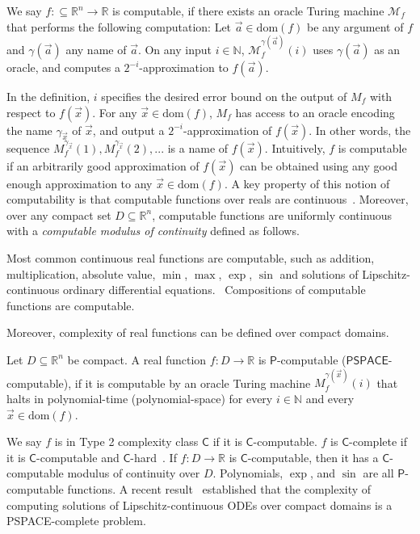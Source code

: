 \documentclass[envcountsect]{llncs}
\newcommand{\dom}{\mathrm{dom}}
\begin{document}
\begin{definition} We say $f:\subseteq\mathbb{R}^n\rightarrow \mathbb{R}$ is computable, if there exists an oracle Turing machine $\mathcal{M}_f$ that performs the following computation: Let $\vec a\in \dom(f)$ be any argument of $f$ and $\gamma(\vec a)$ any name of $\vec a$. On any input $i\in \mathbb{N}$, $\mathcal{M}_f^{\gamma(\vec a)}(i)$ uses $\gamma(\vec a)$ as an oracle, and computes a $2^{-i}$-approximation to $f(\vec a)$. 
\end{definition}



In the definition, $i$ specifies the desired error bound on the output of $M_f$ with respect to $f(\vec x)$. For any $\vec x\in \dom(f)$, $M_f$ has access to an oracle encoding the name $\gamma_{\vec x}$ of $\vec x$, and output a $2^{-i}$-approximation of $f(\vec x)$. In other words, the sequence $M_f^{\gamma_{\vec x}}(1), M_f^{\gamma_{\vec x}}(2), ...$ is a name of $f(\vec x)$. Intuitively, $f$ is computable if an arbitrarily good approximation of $f(\vec x)$ can be obtained using any good enough approximation to any $\vec x\in\dom(f)$. A key property of this notion of computability is that computable functions over reals are continuous~\cite{CAbook}. Moreover, over any compact set $D\subseteq \mathbb{R}^n$, computable functions are uniformly continuous with a {\em computable modulus of continuity} defined as follows. 

Most common continuous real functions are computable, such as addition, multiplication, absolute value, $\min$, $\max$, $\exp$, $\sin$ and solutions of Lipschitz-continuous ordinary differential equations.~\cite{CAbook} Compositions of computable functions are computable.


Moreover, complexity of real functions can be defined over compact domains. 

\begin{definition}[\cite{Ko92}] Let $D\subseteq \mathbb{R}^n$ be compact. A real function $f:D\rightarrow\mathbb{R}$ is $\mathsf{P}$-computable ($\mathsf{PSPACE}$-computable), if it is computable by an oracle Turing machine $M_{f}^{\gamma(\vec x)}(i)$ that halts in polynomial-time (polynomial-space) for every $i\in \mathbb{N}$ and every $\vec x\in \dom(f)$. 
\end{definition}



We say $f$ is in Type 2 complexity class $\mathsf{C}$ if it is $\mathsf{C}$-computable. $f$ is $\mathsf{C}$-complete if it is $\mathsf{C}$-computable and $\mathsf{C}$-hard~\cite{Kobook}. If $f:D\rightarrow \mathbb{R}$ is $\mathsf{C}$-computable, then it has a $\mathsf{C}$-computable modulus of continuity over $D$. Polynomials, $\exp$, and $\sin$ are all $\mathsf{P}$-computable functions. A recent result~\cite{Kawamura09} established that the complexity of computing solutions of Lipschitz-continuous ODEs over compact domains is a {\sf PSPACE}-complete problem. 
\end{document}
